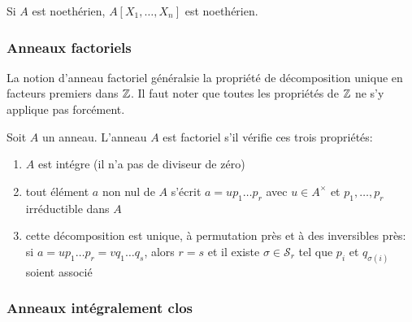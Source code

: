 \begin{corollary}{}{}
    Si $A$ est noethérien, $A[X_1,\dots,X_n]$ est noethérien.
\end{corollary}




\subsubsection{Anneaux factoriels}

La notion d'anneau factoriel généralsie la propriété de décomposition unique en facteurs premiers dans $\mathbb{Z}$.
Il faut noter que toutes les propriétés de $\mathbb{Z}$ ne s'y applique pas forcément. 

\begin{definition}{}{}
    Soit $A$ un anneau. L'anneau $A$ est factoriel s'il vérifie ces trois propriétés:
    \begin{enumerate}[(1)]
        \item $A$ est intégre (il n'a pas de diviseur de zéro)
        \item tout élément $a$ non nul de $A$ s'écrit $a = u p_1 \dots p_r$ avec $u \in A^\times$
              et $p_1, \dots, p_r$ irréductible dans $A$
        \item cette décomposition est unique, à permutation près et à des inversibles près:
              si $a = u p_1 \dots p_r = v q_1 \dots q_s$, alors $r = s$ 
              et il existe $\sigma \in \mathscr{S}_r$ tel que $p_i$ et $q_{\sigma(i)}$ soient associé
    \end{enumerate}
\end{definition}




\subsubsection{Anneaux intégralement clos}